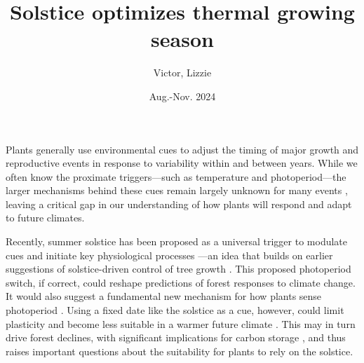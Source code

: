 \documentclass[11pt,letter]{article}
\title{Solstice optimizes thermal growing season}
\author{Victor, Lizzie}
\date{Aug.-Nov. 2024}
\begin{document}
\maketitle


Plants generally use environmental cues to adjust the timing of major growth and reproductive events in response to variability within and between years. While we often know the proximate triggers---such as temperature and photoperiod---the larger mechanisms behind these cues remain largely unknown for many events \citep{Chuine2017}, leaving a critical gap in our understanding of how plants will respond and adapt to future climates.

Recently, summer solstice has been proposed as a universal trigger to modulate cues and initiate key physiological processes \citep{Zohner2023, Journe2024}---an idea that builds on earlier suggestions of solstice-driven control of tree growth \citep{Rossi2006}. This proposed photoperiod switch, if correct, 
could reshape predictions of forest responses to climate change. It would also suggest a fundamental new mechanism for how plants sense photoperiod \citep{Gendron2023}. 
Using a fixed date like the solstice as a cue, however, could limit plasticity and become less suitable 
in a warmer future climate \citep{Bonamour2019}. 
This may in turn drive forest declines, with significant implications for carbon storage \citep{green2022limits}, and thus raises important questions about the suitability for plants to rely on the solstice. 
\end{document}
